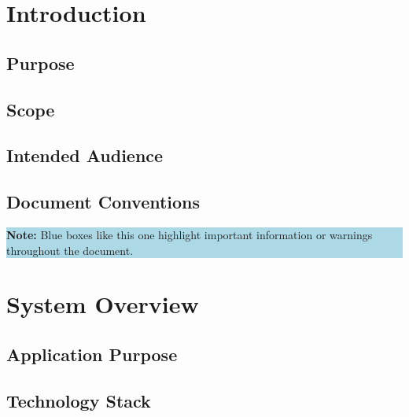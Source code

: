 \documentclass[12pt, a4paper]{report}
\newcommand{\infobox}[1]{%
	\vspace{6pt}
	\noindent
	\colorbox{LightBlue}{%
		\begin{minipage}{\dimexpr\linewidth-2\fboxsep}%
			\vspace{4pt}
			\small #1
			\vspace{4pt}
		\end{minipage}%
	}
	\vspace{6pt}
}
\begin{document}
	\chapter{Introduction}
	
	\section{Purpose}
	
	\section{Scope}
	
	\section{Intended Audience}
	
	\section{Document Conventions}
	
	\infobox{\textbf{Note:} Blue boxes like this one highlight important
		information or warnings throughout the document.}
	
	\chapter{System Overview}
	
	\section{Application Purpose}
	
	\section{Technology Stack}
	
\end{document}
